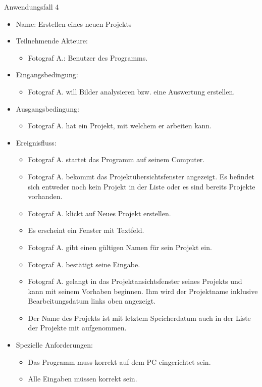 \begin{itemize}
	\begin{description}
		\item[Anwendungsfall 4]
	\end{description}
	
		\begin{itemize}
			\item Name: Erstellen eines neuen Projekts
			\item Teilnehmende Akteure:
			\begin{itemize}
				\item	Fotograf A.: Benutzer des Programms.
			\end{itemize}
			\item Eingangsbedingung:
			\begin{itemize}
				\item Fotograf A. will Bilder analysieren bzw. eine Auswertung erstellen.						
			\end{itemize}
			\item Ausgangsbedingung:
			\begin{itemize}
				\item	Fotograf A. hat ein Projekt, mit welchem er arbeiten kann.		
			\end{itemize}
			\item Ereignisfluss:
			\begin{itemize}
				\item Fotograf A. startet das Programm auf seinem Computer.
				\item Fotograf A. bekommt das Projektübersichtsfenster angezeigt. Es befindet sich entweder noch kein Projekt in der Liste oder es sind bereits Projekte vorhanden.
				\item Fotograf A. klickt auf Neues Projekt erstellen.
				\item Es erscheint ein Fenster mit Textfeld.
				\item Fotograf A. gibt einen gültigen Namen für sein Projekt ein.
				\item Fotograf A. bestätigt seine Eingabe.
				\item Fotograf A. gelangt in das Projektansichtsfenster seines Projekts und kann mit seinem Vorhaben beginnen. Ihm wird der Projektname inklusive Bearbeitungsdatum links oben angezeigt.
				\item Der Name des Projekts ist mit letztem Speicherdatum auch in der Liste der Projekte mit aufgenommen.
			\end{itemize}
			\item Spezielle Anforderungen:
			\begin{itemize}
				\item	Das Programm muss korrekt auf dem PC eingerichtet sein.
				\item Alle Eingaben müssen korrekt sein.
			\end{itemize}			
		\end{itemize}
		

\end{itemize}
